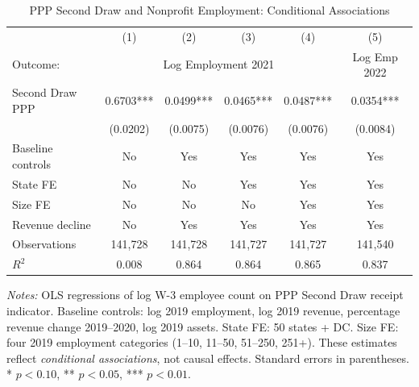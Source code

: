 \begin{table}[H]
\centering
\caption{PPP Second Draw and Nonprofit Employment: Conditional Associations}
\label{tab:ols}
\begin{threeparttable}
\begin{tabular}{l*{5}{c}}
\toprule
 & (1) & (2) & (3) & (4) & (5) \\
Outcome: & \multicolumn{4}{c}{Log Employment 2021} & Log Emp 2022 \\
\midrule
Second Draw PPP & 0.6703*** & 0.0499*** & 0.0465*** & 0.0487*** & 0.0354*** \\
 & (0.0202) & (0.0075) & (0.0076) & (0.0076) & (0.0084) \\
\addlinespace
Baseline controls & No & Yes & Yes & Yes & Yes \\
State FE & No & No & Yes & Yes & Yes \\
Size FE & No & No & No & Yes & Yes \\
Revenue decline & No & Yes & Yes & Yes & Yes \\
\addlinespace
Observations & 141,728 & 141,728 & 141,727 & 141,727 & 141,540 \\
$R^2$ & 0.008 & 0.864 & 0.864 & 0.865 & 0.837 \\
\bottomrule
\end{tabular}
\begin{tablenotes}[flushleft]
\small
\item \textit{Notes:} OLS regressions of log W-3 employee count on PPP Second Draw receipt indicator. Baseline controls: log 2019 employment, log 2019 revenue, percentage revenue change 2019--2020, log 2019 assets. State FE: 50 states + DC. Size FE: four 2019 employment categories (1--10, 11--50, 51--250, 251+). These estimates reflect \textit{conditional associations}, not causal effects. Standard errors in parentheses. * $p<0.10$, ** $p<0.05$, *** $p<0.01$.
\end{tablenotes}
\end{threeparttable}
\end{table}
